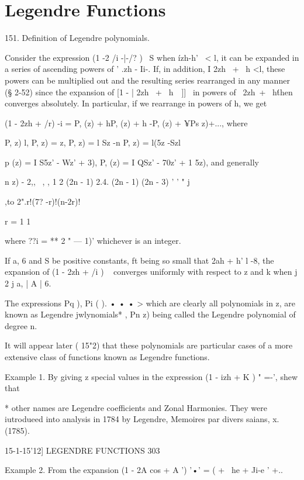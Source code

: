 \chapter{Legendre Functions} 

151. Definition of Legendre polynomials. 

Consider the expression (1 -2 /i -|-/? )~ S when \'izh-h' \ < l, it can be 
expanded in a series of ascending powers of ' .zh - Ii-. If, in addition, 
I 2zh \ + \ h <l, these powers can be multiplied out and the resulting series 
rearranged in any manner (§ 2-52) since the expansion of [1 -   | 2zh \ + \ h\ \  ]]~  
in powers of \ 2zh\ + \ h\'  then converges absolutely. In particular, if we 
rearrange in powers of h, we get 

(1 - 2zh + /r) -i = P, (z) + hP, (z) + h -P, (z) + ¥Ps  z)+..., 
where 

P, z) l, P, z) = z, P, z) = l Sz -n P, z) = l(5z -Szl 

p  (z) = I  S5z' - Wz' + 3), P, (z) = I  QSz' - 70z' + 1 5z), 
and generally 

 n  z) - 2,, \     , , 1  2 (2n - 1)  2.4. (2n - 1) (2n - 3) ' ' " j 

,to 2".r!(7? -r)!(n-2r)! 



r = 
1 1 



where ??i =   **   2  " — 1)' whichever is an integer. 

If a, 6 and S be positive constants, ft being so small that 2ah + h' l -8, the expansion 
of (1 - 2zh + /i ) ~   converges uniformly with respect to z and k when j 2 j  a, | A |  6. 

The expressions Pq   ), Pi ( ). • • • > which are clearly all polynomials in z, 
are known as Legendre jwlynomials* , Pn  z) being called the Legendre 
polynomial of degree n. 

It will appear later ( 15"2) that these polynomials are particular cases of a more 
extensive class of functions known as Legendre functions. 

Example 1. By giving z special values in the expression (1 - izh + K ) " =-', shew that 

* other names are Legendre coefficients and Zonal Harmonies. They were iutrodueed into 
analysis in 1784 by Legendre, Memoires par divers saians, x. (1785). 



15-1-15'12] LEGENDRE FUNCTIONS 303 

Example 2. From the expansion 
(1 - 2A cos   + A ') '•' = ( + \ he + Ji-e ' +..\ 



